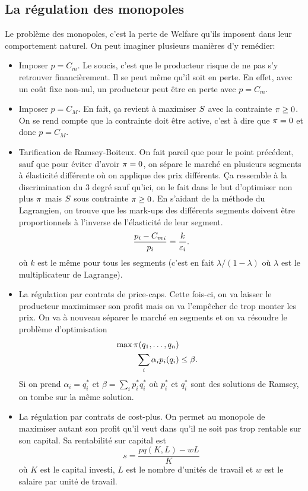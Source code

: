 \subsection{La régulation des monopoles}
Le problème des monopoles, c'est la perte de Welfare qu'ils imposent
dans leur comportement naturel.
On peut imaginer plusieurs manières d'y remédier:
\begin{itemize}
  \item Imposer $p = C_m$.
    Le soucis, c'est que le producteur risque de ne pas s'y retrouver
    financièrement. Il se peut même qu'il soit en perte.
    En effet, avec un coût fixe non-nul, un producteur peut être en perte
    avec $p = C_m$.
  \item Imposer $p = C_M$.
    En fait, ça revient à maximiser $S$ avec la contrainte
    $\pi \geq 0$.
    On se rend compte que la contrainte doit être active, c'est à dire que
    $\pi = 0$ et donc $p = C_M$.
  \item Tarification de Ramsey-Boiteux.
    On fait pareil que pour le point précédent, sauf que pour éviter
    d'avoir $\pi = 0$,
    on sépare le marché en plusieurs segments à élasticité différente
    où on applique des prix différents.
    Ça ressemble à la discrimination du 3\ieme{} degré sauf qu'ici,
    on le fait dans le but d'optimiser non plus $\pi$ mais $S$
    sous contrainte $\pi \geq 0$.
    En s'aidant de la méthode du Lagrangien, on trouve que les
    mark-ups des différents segments doivent être proportionnels à l'inverse
    de l'élasticité de leur segment.
    \[ \frac{p_i - {C_m}_i}{p_i} = \frac{k}{\varepsilon_i}. \]
    où $k$ est le même pour tous les segments (c'est en fait
    $\lambda/(1-\lambda)$ où $\lambda$ est le multiplicateur de Lagrange).
  \item La régulation par contrats de price-caps.
    Cette fois-ci, on va laisser le producteur maximimser son profit
    mais on va l'empêcher de trop monter les prix.
    On va à nouveau séparer le marché en segments et on va résoudre
    le problème d'optimisation
    \begin{align*}
      \max \pi(q_1,\ldots,q_n)\\
      \sum_i \alpha_ip_i(q_i) & \leq \beta.
    \end{align*}
    Si on prend $\alpha_i = q_i^*$ et $\beta = \sum_i p_i^*q_i^*$
    où $p_i^*$ et $q_i^*$ sont des solutions de Ramsey, on tombe
    sur la même solution.
  \item La régulation par contrats de cost-plus.
    On permet au monopole de maximiser autant son profit qu'il veut
    dans qu'il ne soit pas trop rentable sur son capital.
    Sa rentabilité sur capital est
    \[ s = \frac{pq(K, L) - wL}{K} \]
    où $K$ est le capital investi, $L$ est le nombre d'unités de travail
    et $w$ est le salaire par unité de travail.


\end{itemize}
